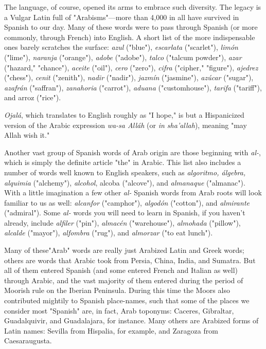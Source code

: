 The language, of course, opened its arms to embrace such
diversity. The legacy is a Vulgar Latin full of "Arabisms"---more
than 4,000 in all have survived in Spanish to our day. Many of these
words were to pass through Spanish (or more commonly, through
French) into English. A short list of the more indispensable ones
barely scratches the surface: \emph{azul} ("blue"), \emph{escarlata} ("scarlet"), \emph{limón} ("lime"), \emph{naranja} ("orange"), \emph{adobe} ("adobe"), \emph{talco} ("talcum
powder"), \emph{azar} ("hazard," "chance"), \emph{aceite} ("oil"), \emph{cero} ("zero"), \emph{cifra}
("cipher," "figure"), \emph{ajedrez} ("chess"), \emph{cenit} ("zenith"), \emph{nadir} ("nadir"),
\emph{jazmín} ("jasmine"), \emph{azúcar} ("sugar"), \emph{azafrán} ("saffran"), \emph{zanahoria}
("carrot"), \emph{aduana} ("customhouse"), \emph{tarifa} ("tariff"), and arroz ("rice").

\emph{Ojalá}, which translates to English roughly as "I hope," is but
a Hispanicized version of the Arabic expression \emph{wa-sa Alláh} (or \emph{in
sha'allah}), meaning "may Allah wish it."

Another vast group of Spanish words of Arab origin are those
beginning with \emph{al-}, which is simply the definite article "the" in Arabic. This list also includes a number of words well known to English
speakers, such as \emph{algoritmo, álgebra, alquimia} ("alchemy"), \emph{alcohol},
alcoba ("alcove"), and \emph{almanaque} ("almanac"). With a little imagination a few other \emph{al-} Spanish words from Arab roots will look familiar
to us as well: \emph{alcanfor} ("camphor"), \emph{algodón} ("cotton"), and \emph{almirante}
("admiral"). Some \emph{al-} words you will need to learn in Spanish, if you
haven't already, include \emph{alfiler} ("pin"), \emph{almacén} ("warehouse"), \emph{almohada} ("pillow"), \emph{alcalde} ("mayor"), \emph{alfombra} ("rug"), and \emph{almorzar}
("to eat lunch").

Many of these"Arab" words are really just Arabized Latin and
Greek words; others are words that Arabic took from Persia, China, India, and Sumatra. But all of them entered Spanish (and some entered
French and Italian as well) through Arabic, and the vast majority of
them entered during the period of Moorish rule on the Iberian Peninsula. During this time the Moors also contributed mightily to Spanish
place-names, such that some of the places we consider most "Spanish"
are, in fact, Arab toponyms: Caceres, Gibraltar, Guadalquivir, and
Guadalajara, for instance. Many others are Arabized forms of Latin
names: Sevilla from Hispalia, for example, and Zaragoza from Caesaraugusta.

